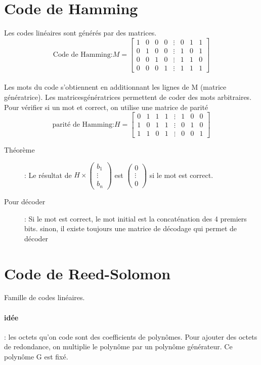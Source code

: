 \documentclass[10pt,a4paper]{article}
\begin{document}
\section{Code de Hamming}
	Les codes linéaires sont générés par des matrices.
	\[\text{Code de Hamming:}  M = \left[\begin{matrix}
	1&0&0&0&\vdots&0&1&1\\
	0&1&0&0&\vdots&1&0&1\\
	0&0&1&0&\vdots&1&1&0\\
	0&0&0&1&\vdots&1&1&1
	\end{matrix}\right]\]\\
	Les mots du code s'obtiennent en additionnant les lignes de M (matrice génératrice). Les matricesgénératrices permettent de coder des mots arbitraires.\\
	Pour vérifier si un mot et correct, on utilise une matrice de parité
	\[\text{parité de Hamming:}H=\left[\begin{matrix}
	0&1&1&1&\vdots&1&0&0\\
	1&0&1&1&\vdots&0&1&0\\
	1&1&0&1&\vdots&0&0&1
	\end{matrix}\right]\]
	\begin{description}
		\item[Théorème]: Le résultat de $\displaystyle H\times\left(\begin{matrix}b_1\\ \vdots\\b_n\end{matrix}\right)$ est $\displaystyle\left(\begin{matrix}0\\ \vdots\\ 0\end{matrix}\right)$ si le mot est correct.
		\item[Pour décoder]: Si le mot est correct, le mot initial est la concaténation des 4 premiers bits. sinon, il existe toujours une matrice de décodage qui permet de décoder
	\end{description}
\section{Code de Reed-Solomon}
	Famille de codes linéaires.
	\paragraph{idée}: les octets qu'on code sont des coefficients de polynômes. Pour ajouter des octets de redondance, on multiplie le polynôme par un polynôme générateur. Ce polynôme G est fixé.
\end{document}
